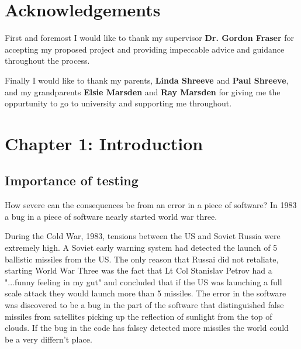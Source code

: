 \documentclass{article}
\begin{document}
\newpage
{}
\section*{Acknowledgements}
First and foremost I would like to thank my supervisor \textbf{Dr. Gordon Fraser} for accepting my proposed project and providing impeccable advice and guidance throughout the process.
\par{\noindent} Finally I would like to thank my parents, \textbf{Linda Shreeve} and \textbf{Paul Shreeve}, and my grandparents \textbf{Elsie Marsden} and \textbf{Ray Marsden} for giving me the oppurtunity to go to university and supporting me throughout.

\newpage
\tableofcontents

\newpage	
{}
\section{Chapter 1: Introduction}


\subsection{Importance of testing}

\par How severe can the consequences be from an error in a piece of software? In 1983 a bug in a piece of software nearly started world war three.

\par During the Cold War, 1983, tensions between the US and Soviet Russia were extremely high. A Soviet early warning system had detected the launch of 5 ballistic missiles from the US. The only reason that Russai did not retaliate, starting World War Three was the fact that Lt Col Stanislav Petrov had a "...funny feeling in my gut" and concluded that if the US was launching a full scale attack they would launch more than 5 missiles. The error in the software was discovered to be a bug in the part of the software that distinguished false missiles from satellites picking up the reflection of sunlight from the top of clouds.\cite{ZDNetDisasters} If the bug in the code has falsey detected more missiles the world could be a very differn't place.
\end{document}
